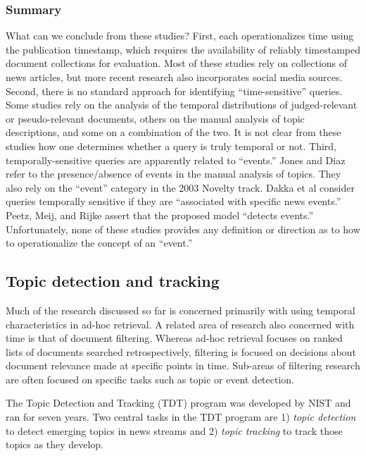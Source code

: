 \documentclass{sig-alternate}
\begin{document}
\subsubsection{Summary}

What can we conclude from these studies? First, each operationalizes time using the publication timestamp, which requires the availability of reliably timestamped document collections for evaluation.  Most of these studies rely on collections of news articles, but more recent research also incorporates social media sources.  Second, there is no standard approach for identifying ``time-sensitive'' queries. Some studies rely on the analysis of the temporal distributions of judged-relevant or pseudo-relevant documents, others on the manual analysis of topic descriptions, and some on a combination of the two.  It is not clear from these studies how one determines whether a query is truly temporal or not.  Third, temporally-sensitive queries are apparently related to ``events.'' Jones and Diaz refer to the presence/absence of events in the manual analysis of topics. They also rely on the ``event'' category in the 2003 Novelty track.  Dakka et al consider queries temporally sensitive if they are ``associated with specific news events.''  Peetz, Meij, and Rijke assert that the proposed model ``detects events.''  Unfortunately, none of these studies provides any definition or direction as to how to operationalize the concept of an ``event.''

\subsection{Topic detection and tracking}

Much of the research discussed so far is concerned primarily with using temporal characteristics in ad-hoc retrieval. A related area of research also concerned with time is that of document filtering. Whereas ad-hoc retrieval focuses on ranked lists of documents searched retrospectively, filtering is focused on decisions about document relevance made at specific points in time. Sub-areas of filtering research are often focused on specific tasks such as topic or event detection. 

The Topic Detection and Tracking (TDT) program was developed by NIST and ran for seven years.  Two central tasks in the TDT program are 1) \emph{topic detection} to detect emerging topics in news streams and 2) \emph{topic tracking} to track those topics as they develop. 
\end{document}
